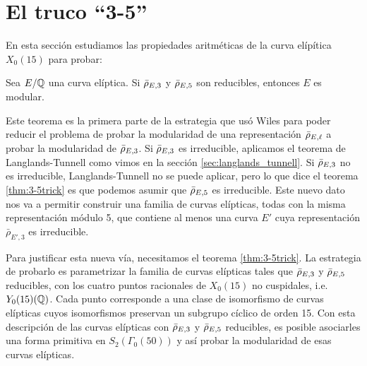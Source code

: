 \section{El truco ``3-5''}\label{sec:3-5}


%

En esta secci\'on estudiamos las propiedades aritméticas de la curva elípítica $X_0(15)$ para probar:

\begin{thm}\label{thm:3-5trick}%
	Sea $E/\mathbb{Q}$ una curva elíptica. Si $\bar{\rho}_{E,3}$ y $\bar{\rho}_{E,5}$ son reducibles, entonces $E$ es modular.
\end{thm}

Este teorema es la  primera parte de la estrategia que usó Wiles para poder reducir el problema de probar la modularidad de una representación $\bar{\rho}_{E,\ell}$ a probar la modularidad de $\bar{\rho}_{E,3}$. Si $\bar{\rho}_{E,3}$ es irreducible, aplicamos el teorema de Langlands-Tunnell como vimos en la sección \ref{sec:langlands_tunnell}. Si $\bar{\rho}_{E,3}$ no es irreducible, Langlands-Tunnell no se puede aplicar, pero lo que dice el teorema \ref{thm:3-5trick} es que podemos asumir que $\bar{\rho}_{E,5}$ es irreducible. Este nuevo dato nos va a permitir construir una familia de curvas elípticas, todas con la misma representación módulo 5, que contiene al menos una curva $E'$ cuya representación $\bar{\rho}_{E',3}$ es irreducible.

Para justificar esta nueva vía, necesitamos el teorema \ref{thm:3-5trick}. La estrategia de probarlo es parametrizar la familia de curvas elípticas tales que $\bar{\rho}_{E,3}$ y $\bar{\rho}_{E,5}$ reducibles, con los cuatro puntos racionales de $X_0(15)$ no cuspidales, i.e. $Y_0(15)(\mathbb{Q})$. Cada punto corresponde a una clase de isomorfismo de curvas elípticas cuyos isomorfismos preservan un subgrupo cíclico de orden 15. Con esta descripción de las curvas elípticas con $\bar{\rho}_{E,3}$ y $\bar{\rho}_{E,5}$ reducibles, es posible asociarles una forma primitiva en $S_2(\Gamma_0(50))$ y así probar la modularidad de esas curvas elípticas. 

